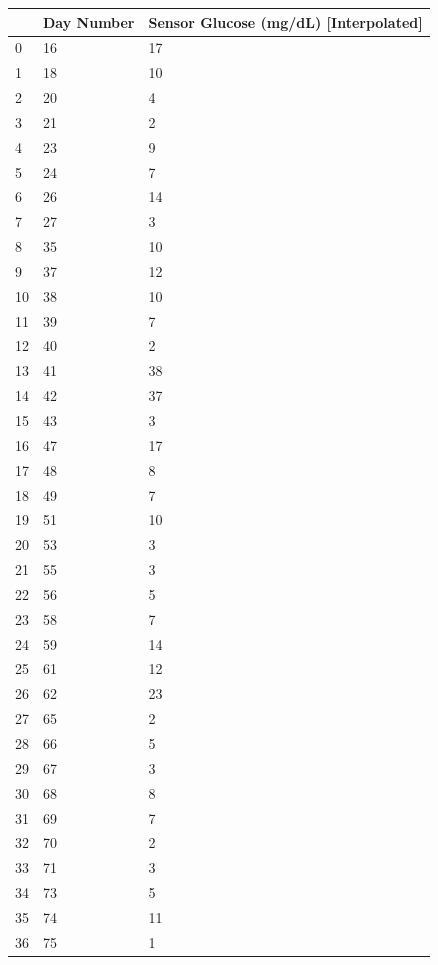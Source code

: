 \bigskip\noindent
\begin{tabular}{p{}p{}p{}}
\toprule
 & Day Number & Sensor Glucose (mg/dL) [Interpolated] \\
\hline
0 & 16 & 17 \\
\hline
1 & 18 & 10 \\
\hline
2 & 20 & 4 \\
\hline
3 & 21 & 2 \\
\hline
4 & 23 & 9 \\
\hline
5 & 24 & 7 \\
\hline
6 & 26 & 14 \\
\hline
7 & 27 & 3 \\
\hline
8 & 35 & 10 \\
\hline
9 & 37 & 12 \\
\hline
10 & 38 & 10 \\
\hline
11 & 39 & 7 \\
\hline
12 & 40 & 2 \\
\hline
13 & 41 & 38 \\
\hline
14 & 42 & 37 \\
\hline
15 & 43 & 3 \\
\hline
16 & 47 & 17 \\
\hline
17 & 48 & 8 \\
\hline
18 & 49 & 7 \\
\hline
19 & 51 & 10 \\
\hline
20 & 53 & 3 \\
\hline
21 & 55 & 3 \\
\hline
22 & 56 & 5 \\
\hline
23 & 58 & 7 \\
\hline
24 & 59 & 14 \\
\hline
25 & 61 & 12 \\
\hline
26 & 62 & 23 \\
\hline
27 & 65 & 2 \\
\hline
28 & 66 & 5 \\
\hline
29 & 67 & 3 \\
\hline
30 & 68 & 8 \\
\hline
31 & 69 & 7 \\
\hline
32 & 70 & 2 \\
\hline
33 & 71 & 3 \\
\hline
34 & 73 & 5 \\
\hline
35 & 74 & 11 \\
\hline
36 & 75 & 1 \\
\hline

\end{tabular}
